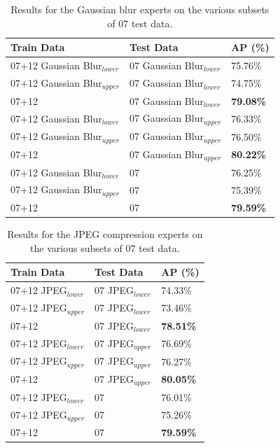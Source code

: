 \begin{table}[!htbp]
\centering
\caption{Results for the Gaussian blur experts on the various subsets of 07 test data.}
\label{tab:gb_experts}
\begin{tabular}{|l|l|l|}
\hline
\textbf{Train Data}           & \textbf{Test Data}        & \textbf{AP (\%)} \\ \hline
07+12 Gaussian Blur$_{lower}$ & 07 Gaussian Blur$_{lower}$ & 75.76\% \\ \hline
07+12 Gaussian Blur$_{upper}$ & 07 Gaussian Blur$_{lower}$ & 74.75\% \\ \hline
07+12               & 07 Gaussian Blur$_{lower}$ & \textbf{79.08\%} \\ \hline
07+12 Gaussian Blur$_{lower}$ & 07 Gaussian Blur$_{upper}$ & 76.33\% \\ \hline
07+12 Gaussian Blur$_{upper}$ & 07 Gaussian Blur$_{upper}$ & 76.50\% \\ \hline
07+12               & 07 Gaussian Blur$_{upper}$ & \textbf{80.22\%} \\ \hline
07+12 Gaussian Blur$_{lower}$ & 07               & 76.25\% \\ \hline
07+12 Gaussian Blur$_{upper}$ & 07               & 75.39\% \\ \hline
07+12               & 07               & \textbf{79.59\%} \\ \hline
\end{tabular}
\end{table}



\begin{table}[!htbp]
\centering
\caption{Results for the JPEG compression experts on the various subsets of 07 test data.}
\label{tab:jpeg_experts}
\begin{tabular}{|l|l|l|}
\hline
\textbf{Train Data}           & \textbf{Test Data}        & \textbf{AP (\%)} \\ \hline
07+12 JPEG$_{lower}$ & 07 JPEG$_{lower}$ & 74.33\% \\ \hline
07+12 JPEG$_{upper}$ & 07 JPEG$_{lower}$ & 73.46\% \\ \hline
07+12               & 07 JPEG$_{lower}$ & \textbf{78.51\%} \\ \hline
07+12 JPEG$_{lower}$ & 07 JPEG$_{upper}$ & 76.69\% \\ \hline
07+12 JPEG$_{upper}$ & 07 JPEG$_{upper}$ & 76.27\% \\ \hline
07+12               & 07 JPEG$_{upper}$ & \textbf{80.05\%} \\ \hline
07+12 JPEG$_{lower}$ & 07               & 76.01\% \\ \hline
07+12 JPEG$_{upper}$ & 07               & 75.26\% \\ \hline
07+12               & 07               & \textbf{79.59\%} \\ \hline
\end{tabular}
\end{table}

